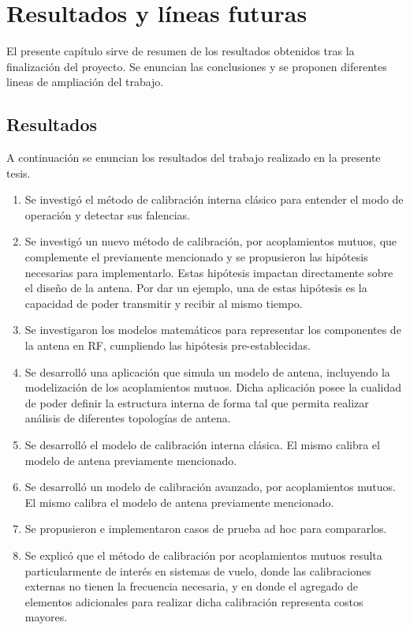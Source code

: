 \chapter{Resultados y líneas futuras}

El presente capítulo sirve de resumen de los resultados obtenidos tras la finalización del proyecto. Se enuncian las 
conclusiones y se proponen diferentes lineas de ampliación del trabajo.

\section{Resultados}

A continuación se enuncian los resultados del trabajo realizado en la presente tesis. 
\begin{enumerate}
	\item Se investigó el método de calibración interna clásico para entender el modo de operación y detectar sus falencias.
	\item Se investigó un nuevo método de calibración, por acoplamientos mutuos, que complemente el previamente mencionado y se
		propusieron las hipótesis necesarias para implementarlo. Estas hipótesis impactan directamente sobre el diseño de la
		antena. Por dar un ejemplo, una de estas hipótesis es la capacidad de poder transmitir y recibir al mismo tiempo.
	\item Se investigaron los modelos matemáticos para representar los componentes de la antena en RF, cumpliendo las hipótesis
		pre-establecidas.
	\item Se desarrolló una aplicación que simula un modelo de antena, incluyendo la modelización de los acoplamientos
		mutuos. Dicha aplicación posee la cualidad de poder definir la estructura interna de forma tal que permita realizar 
		análisis de diferentes topologías de antena.
	\item Se desarrolló el modelo de calibración interna clásica. El mismo calibra el modelo de antena previamente mencionado.
	\item Se desarrolló un modelo de calibración avanzado, por acoplamientos mutuos. El mismo calibra el modelo de antena
		previamente mencionado. 
	\item Se propusieron e implementaron casos de prueba ad hoc para compararlos.
	\item Se explicó que el método de calibración por acoplamientos mutuos resulta particularmente de interés en sistemas de
		vuelo, donde las calibraciones externas no tienen la frecuencia necesaria, y en donde el agregado de elementos
	adicionales para realizar dicha calibración representa costos mayores.
\end{enumerate}

